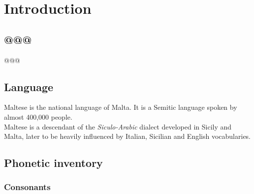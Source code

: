 \documentclass[11pt,draft]{article}
\begin{document}
\maketitle


\section{Introduction}

\subsection{@@@}
@@@

\subsection{Language}
Maltese is the national language of Malta. It is a Semitic language spoken by almost 400,000 people\cite{borg1997maltese}.\\
Maltese is a descendant of the \emph{Siculo-Arabic} dialect developed in Sicily and Malta, later to be heavily influenced by Italian, Sicilian and English vocabularies.

\subsection{Phonetic inventory}

\subsubsection{Consonants}

\end{document}
